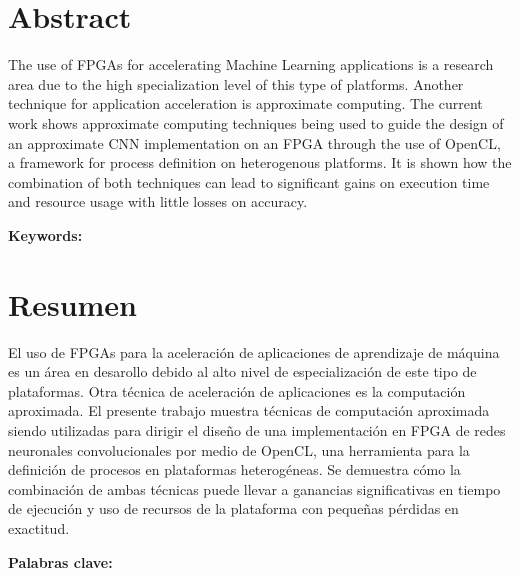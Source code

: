\chapter*{Abstract}
\thispagestyle{empty}

The use of FPGAs for accelerating Machine Learning applications
is a research area due to the high specialization level of
this type of platforms. Another technique for application
acceleration is approximate computing. The current work shows
approximate computing techniques being used to guide the
design of an approximate CNN implementation on an FPGA
through the use of OpenCL, a framework for process definition
on heterogenous platforms. It is shown how the combination
of both techniques can lead to significant gains on execution
time and resource usage with little losses on accuracy.

\bigskip

\textbf{Keywords:} \thesisKeywordsEN

\clearpage
\chapter*{Resumen}
\thispagestyle{empty}

El uso de FPGAs para la aceleraci\'on de aplicaciones
de aprendizaje de m\'aquina es un área en desarollo
debido al alto nivel de especialización de este tipo de
plataformas. Otra técnica de aceleración de aplicaciones
es la computación aproximada. El presente trabajo muestra
técnicas de computación aproximada siendo utilizadas para
dirigir el diseño de una implementación en FPGA de redes
neuronales convolucionales por medio de OpenCL, una
herramienta para la definición de procesos en plataformas
heterogéneas. Se demuestra cómo la combinación
de ambas técnicas puede llevar a ganancias significativas
en tiempo de ejecución y uso de recursos de la plataforma
con pequeñas pérdidas en exactitud.

\bigskip

\textbf{Palabras clave:} \thesisKeywordsES

\cleardoublepage

